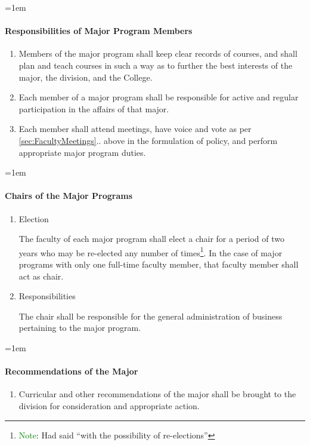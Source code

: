 \documentclass{manual}
\let\oldparagraph\paragraph
\renewcommand\paragraph{\leftskip=1em\oldparagraph}
\newcommand{\editRemark}[3]{\textcolor{green}{#2}\footnote{\textcolor{green}{#1}: #3}}
\newcommand{\editNote}[1]{\editRemark{Note}{}{#1}}
\newcommand{\itemLevelA}{\alph*.}
\newcommand{\itemRefA}{\alph*}
\begin{document}
\paragraph{Responsibilities of Major Program Members}
\begin{enumerate}[label=\itemLevelA,ref=\itemRefA]
\item Members of the major program shall keep clear records of courses, and shall plan and teach courses in such a way as to further the best interests of the major, the division, and the College.
\item Each member of a major program shall be responsible for active and regular participation in the affairs of that major.
\item Each member shall attend meetings, have voice and vote as per \cref{sec:FacultyMeetings}.. above in the formulation of policy, and perform appropriate major program duties.
\end{enumerate}

\paragraph{Chairs of the Major Programs}
\begin{enumerate}[label=\itemLevelA,ref=\itemRefA]
\item Election

The faculty of each major program shall elect a chair for a period of two years who may be re-elected any number of times\editNote{Had said ``with the possibility of re-elections''}. In the case of major programs with only one full-time faculty member, that faculty member shall act as chair.
\item Responsibilities

The chair shall be responsible for the general administration of business pertaining to the major program.
\end{enumerate}

\paragraph{Recommendations of the Major}
\begin{enumerate}[label=\itemLevelA,ref=\itemRefA]
\item Curricular and other recommendations of the major shall be brought to the division for consideration and appropriate action.
\end{enumerate}
\end{document}

